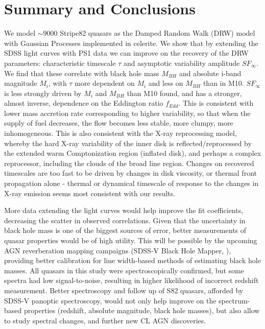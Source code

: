\documentclass[twocolumn]{aastex62}
\newcommand{\project}[1]{\textsf{#1}}
\begin{document}
\section{Summary and Conclusions}\label{sec:conclusions}
We model ${\sim} 9000$ Stripe82 quasars as the Damped Random Walk (DRW) model with Gaussian Processes implemented in \project{celerite}.  We show that by extending the SDSS light curves with PS1 data we can improve on the recovery of the  DRW parameters: characteristic timescale $\tau$ and asymptotic variability amplitude $SF_{\infty}$. We find that these correlate with black hole mass $M_{BH}$ and absolute i-band magnitude $M_{i}$, with $\tau$ more dependent on $M_{i}$ and less on $M_{BH}$ than in M10. $SF_{\infty}$ is less strongly driven by $M_{i}$ and $M_{BH}$ than M10 found, and has a stronger, almost inverse, dependence on the Eddington ratio $f_{Edd}$. This is consistent with lower mass accretion rate corresponding to higher variability, so that when the supply of fuel decreases, the flow becomes less stable, more clumpy, more inhomogeneous.  This is also consistent with the X-ray reprocessing model, whereby the hard X-ray variability of the inner disk is reflected/reprocessed by the extended warm Comptonization region (inflated disk), and perhaps a complex reprocessor, including the clouds of the broad line region. Changes on recovered timescales are too fast to be driven by changes in disk viscosity, or thermal front propagation alone - thermal or dynamical timescale of response to the changes in X-ray emission seems most consistent with our results.

More data extending the light curves would help improve the fit coefficients, decreasing the scatter in observed correlations. Given that the uncertainty in black hole mass is one of the biggest sources of error, better measurements of quasar properties would be of high utility.  This will be possible by the upcoming AGN reverberation mapping campaigns (SDSS-V Black Hole Mapper, \citealt{kollmeier2017}), providing better calibration for line width-based methods of estimating black hole masses. All quasars in this study were spectroscopically confirmed, but some spectra had low signal-to-noise, resulting in higher likelihood of incorrect redshift measurement. Better spectroscopy and follow up of S82 quasars, afforded by SDSS-V panoptic spectroscopy, would not only help improve on the spectrum-based  properties (redshift, absolute magnitude, black hole masses), but also allow to study spectral changes, and further new CL
AGN discoveries. 
\end{document}
